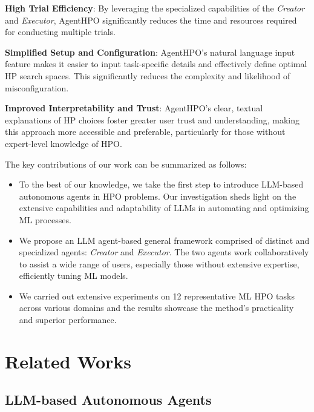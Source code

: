 \documentclass{article}
\begin{document}
\textbf{High Trial Efficiency}: By leveraging the specialized capabilities of the \textit{Creator} and \textit{Executor}, AgentHPO significantly reduces the time and resources required for conducting multiple trials.

\textbf{Simplified Setup and Configuration}: AgentHPO's natural language input feature makes it easier to input task-specific details and effectively define optimal HP search spaces. This significantly reduces the complexity and likelihood of misconfiguration.

\textbf{Improved Interpretability and Trust}: AgentHPO's clear, textual explanations of HP choices foster greater user trust and understanding, making this approach more accessible and preferable, particularly for those without expert-level knowledge of HPO.

The key contributions of our work can be summarized as follows:

\begin{itemize}[leftmargin=*]
    \item {To the best of our knowledge, we take the first step to introduce LLM-based autonomous agents in HPO problems. Our investigation sheds light on the extensive capabilities and adaptability of LLMs in automating and optimizing ML processes.}
    \item {We propose an LLM agent-based general framework comprised of distinct and specialized agents: \textit{Creator} and \textit{Executor}. The two agents work collaboratively to assist a wide range of users, especially those without extensive expertise, efficiently tuning ML models.}
    \item {We carried out extensive experiments on 12 representative ML HPO tasks across various domains and the results showcase the method's practicality and superior performance.}
\end{itemize}

\section{Related Works}
\subsection{LLM-based Autonomous Agents}
\end{document}
